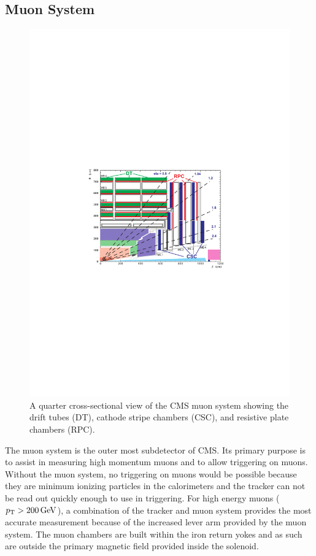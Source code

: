 \subsection{Muon System}

\begin{figure}[!htbp]
    \centering
    \includegraphics[width=\textwidth]{figures/muon_layout.pdf}
    \caption[
        A quarter cross-sectional view of the CMS muon system.
    ]{
        A quarter cross-sectional view of the CMS muon system showing the drift
        tubes (DT), cathode stripe chambers (CSC), and resistive plate chambers
        (RPC).
    }
    \label{fig:muon_layout}
\end{figure}

The muon system is the outer most subdetector of CMS. Its primary purpose is to
assist in measuring high momentum muons and to allow triggering on muons.
Without the muon system, no triggering on muons would be possible because they
are minimum ionizing particles in the calorimeters and the tracker can not be
read out quickly enough to use in triggering. For high energy muons ($\pt >
\SI{200}{\GeV}$), a combination of the tracker and muon system provides the
most accurate measurement because of the increased lever arm provided by the
muon system. The muon chambers are built within the iron return yokes and as
such are outside the primary magnetic field provided inside the solenoid.

